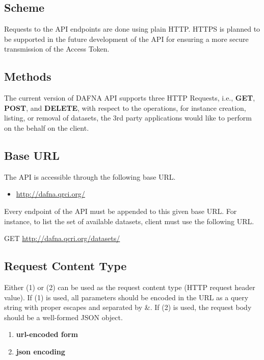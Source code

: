 \documentclass[a4paper,10pt]{scrartcl}
\begin{document}
\subsection{Scheme}
Requests to the API endpoints are done using plain HTTP. HTTPS is planned to be supported 
in the future development of the API for ensuring a more secure transmission of the Access 
Token.
\subsection{Methods}
The current version of DAFNA API supports three HTTP Requests, i.e., \textbf{GET}, \textbf{POST}, and \textbf{DELETE}, 
with respect to the operations, for instance creation, listing, or removal of datasets, the 3rd party applications would
like to perform on the behalf on the client.
\subsection{Base URL}
The API is accessible through the following base URL.
\begin{itemize}
 \item \href{http://dafna.qrci.org/}{http://dafna.qrci.org/}
\end{itemize}
Every endpoint of the API must be appended to this given base URL.
For instance, to list the set of available datasets, client must use 
the following URL.
\begin{description}
\item GET \href{http://dafna.qcri.org/datasets/}{http://dafna.qcri.org/datasets/} 
\end{description}
\subsection{Request Content Type}
Either (1)  or (2)  can be used as the request content type (HTTP request 
header value). If (1) is used, all parameters should be encoded in the URL as a query string with proper escapes and separated by \&. If (2) is used, the request body should 
be a well-formed JSON object. 

\begin{enumerate}
 \item \textbf{url-encoded form}
 \item \textbf{json encoding}
\end{enumerate}
\end{document}
